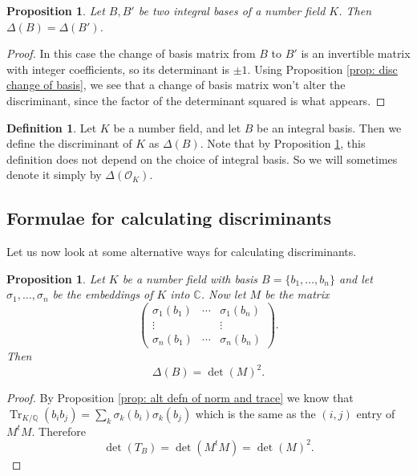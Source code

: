 \documentclass[11pt,a4paper]{report}
\theoremstyle{plain}
\newtheorem{prop}[subsection]{Proposition}
\theoremstyle{definition}
\newtheorem{defn}[subsection]{Definition}
\theoremstyle{definition}
\newcommand{\Tr}{\operatorname{Tr}}
\def\CC{\mathbb{C}}
\def\QQ{\mathbb{Q}}
\def \OO {\mathcal{O}}
\begin{document}
	\begin{prop}\label{prop: int bases disc}
		Let $B,B'$ be two integral bases of a number field $K$. Then $\Delta(B)= \Delta(B')$.
	\end{prop}
	\begin{proof}
		In this case the change of basis matrix from $B$ to $B'$ is an invertible matrix with integer coefficients, so its determinant is $\pm 1$. Using Proposition \ref{prop: disc change of basis}, we see that a change of basis matrix won't alter the discriminant, since the factor of the determinant squared is what appears.
		
		
	\end{proof}
	
	\begin{defn}\label{defn: disc of num field}
		Let $K$ be a number field, and let $B$ be an integral basis. Then we define the discriminant of $K$ as $\Delta(B)$.   Note that by Proposition \ref{prop: int bases disc}, this definition does not depend on the choice of integral basis. So we will sometimes denote it simply by $\Delta(\OO_K)$.
	\end{defn}
	
	
	\subsection{Formulae for calculating discriminants}
	
	Let us now look at some alternative ways for calculating discriminants.
	
	\begin{prop}\label{prop: disc via embs}
		Let $K$ be a number field with basis $B=\{b_1,\dots,b_n\}$ and let $\sigma_1,\dots,\sigma_n$ be the embeddings of $K$ into $\CC$. Now let $M$ be the matrix  \[\left (\begin{matrix} \sigma_1(b_1) &\cdots& \sigma_1(b_n)\\ \vdots & & \vdots \\  \sigma_n(b_1) &\cdots& \sigma_n(b_n)
		\end{matrix} \right ).\] Then \[\Delta(B)=\det(M)^2.\]
	\end{prop}
	
	
	\begin{proof}
		By Proposition \ref{prop: alt defn of norm and trace} we know that  $\Tr_{K/\QQ}(b_i b_j)= \sum_k \sigma_k(b_i)\sigma_k(b_j)$ which is the same as the $(i,j)$ entry of $M^t M$. Therefore \[\det(T_B)=\det(M^t M)=\det(M)^2.\]
	\end{proof}
	
\end{document}
